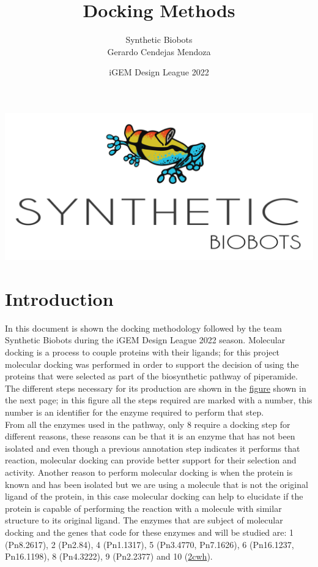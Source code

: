 \documentclass[12pt]{article}
\begin{document}
	\title {Docking Methods}
	\date{iGEM Design League 2022}
	\author{Synthetic Biobots\\Gerardo Cendejas Mendoza}
	
	\maketitle

	\begin{center}
		\includegraphics[scale=0.4]{SB.png}
	\end{center}
	\newpage
	
	\section*{Introduction}
	
	In this document is shown the docking methodology followed by the team  Synthetic Biobots during the iGEM Design League 2022 season. Molecular docking is a process to couple proteins with their ligands; for this project molecular docking was performed in order to support the decision of using the proteins that were selected as part of the biosynthetic pathway of piperamide. The different steps necessary for its production are shown in the \hyperlink{pathway}{figure} shown in the next page; in this figure all the steps required are marked with a number, this number is an identifier for the enzyme required to perform that step.\\
	
	From all the enzymes used in the pathway, only 8 require a docking step for different reasons, these reasons can be that it is an enzyme that has not been isolated and even though a previous annotation step indicates it performs that reaction, molecular docking can provide better support for their selection and activity. Another reason to perform molecular docking is when the protein is known and has been isolated but we are using a molecule that is not the original ligand of the protein, in this case molecular docking can help to elucidate if the protein is capable of performing the reaction with a molecule with similar structure to its original ligand. The enzymes that are subject of molecular docking and the genes that code for these enzymes and will be studied are: 1 (Pn8.2617), 2 (Pn2.84), 4 (Pn1.1317), 5 (Pn3.4770, Pn7.1626), 6 (Pn16.1237, Pn16.1198), 8 (Pn4.3222), 9 (Pn2.2377) and 10 (\href{https://www.rcsb.org/structure/2CWH}{2cwh}).\\
	
\end{document}
